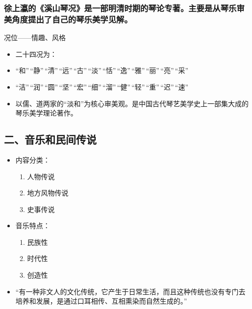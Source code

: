 \documentclass[
]{article}
\providecommand{\tightlist}{%
  \setlength{\itemsep}{0pt}\setlength{\parskip}{0pt}}
\begin{document}
\subsubsection{徐上瀛的《溪山琴况》是一部明清时期的琴论专著。主要是从琴乐审美角度提出了自己的琴乐美学见解。}\label{ux5f90ux4e0aux701bux7684ux6eaaux5c71ux7434ux51b5ux662fux4e00ux90e8ux660eux6e05ux65f6ux671fux7684ux7434ux8bbaux4e13ux8457ux4e3bux8981ux662fux4eceux7434ux4e50ux5ba1ux7f8eux89d2ux5ea6ux63d0ux51faux4e86ux81eaux5df1ux7684ux7434ux4e50ux7f8eux5b66ux89c1ux89e3}

况位------情趣、风格

\begin{itemize}
\tightlist
\item
  二十四况为：
\item
``和''\,``静''\,``清''\,``远''\,``古''\,``淡''\,``恬''\,``逸''\,``雅''\,``丽''\,``亮''\,``采''
\item
``洁''\,``润''\,``圆''\,``坚''\,``宏''\,``细''\,``溜''\,``健''\,``轻''\,``重''\,``迟''\,``速''
\end{itemize}


\begin{itemize}
\tightlist
\item
  以儒、道两家的``淡和''为核心审美观。是中国古代琴艺美学史上一部集大成的琴乐美学理论著作。
\end{itemize}

\subsection{二、音乐和民间传说}\label{ux4e8cux97f3ux4e50ux548cux6c11ux95f4ux4f20ux8bf4}

\begin{itemize}
\tightlist
\item
  内容分类：

  \begin{enumerate}
  \tightlist
  \item
    人物传说
  \item
    地方风物传说
  \item
    史事传说
  \end{enumerate}
\item
  音乐特点：

  \begin{enumerate}
  \tightlist
  \item
    民族性
  \item
    时代性
  \item
    创造性
  \end{enumerate}
\item
  ``有一种非文人的文化传统，它产生于日常生活，而且这种传统也没有专门去培养和发展，是通过口耳相传、互相熏染而自然生成的。''
\end{itemize}
\end{document}
